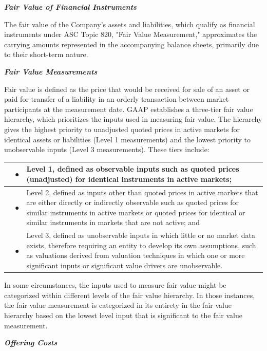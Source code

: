 \documentclass[11pt,a4paper]{article}
\begin{document}
\textit{\textbf{Fair Value of Financial Instruments}}

The fair value of the Company's assets and liabilities, which qualify as financial instruments under ASC Topic 820, "Fair Value Measurement," approximates the carrying amounts represented in the accompanying balance sheets, primarily due to their short-term nature.

\textit{\textbf{Fair Value Measurements}}

Fair value is defined as the price that would be received for sale of an asset or paid for transfer of a liability in an orderly transaction between market participants at the measurement date. GAAP establishes a three-tier fair value hierarchy, which prioritizes the inputs used in measuring fair value. The hierarchy gives the highest priority to unadjusted quoted prices in active markets for identical assets or liabilities (Level 1 measurements) and the lowest priority to unobservable inputs (Level 3 measurements). These tiers include:

\begin{table}[h]
\begin{tabular}{|l|l|l|}
\hline
 & ● & Level 1, defined as observable inputs such as quoted prices (unadjusted) for identical instruments in active markets; \\ \hline
 & ● & Level 2, defined as inputs other than quoted prices in active markets that are either directly or indirectly observable such as quoted prices for similar instruments in active markets or quoted prices for identical or similar instruments in markets that are not active; and \\ \hline
 & ● & Level 3, defined as unobservable inputs in which little or no market data exists, therefore requiring an entity to develop its own assumptions, such as valuations derived from valuation techniques in which one or more significant inputs or significant value drivers are unobservable. \\ \hline
\end{tabular}
\end{table}

In some circumstances, the inputs used to measure fair value might be categorized within different levels of the fair value hierarchy. In those instances, the fair value measurement is categorized in its entirety in the fair value hierarchy based on the lowest level input that is significant to the fair value measurement.

\textit{\textbf{Offering Costs}}
\end{document}
